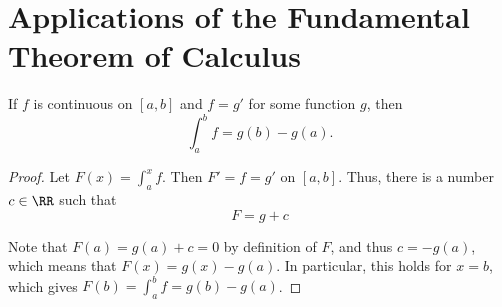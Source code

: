\documentclass[11pt]{scrartcl}
\begin{document}
\section{Applications of the Fundamental Theorem of Calculus}

\begin{corollary}
  If $f$ is continuous on $[a, b]$ and $f = g'$ for some function $g$, then
  \begin{equation*}
    \int_{a}^bf = g(b) - g(a).
  \end{equation*}
\end{corollary}

\begin{proof}
  Let $F(x) = \int_a^xf$. Then $F' = f = g'$ on $[a, b]$. Thus, there
  is a number $c\in \RR$ such that
  \begin{equation*}
    F = g + c
  \end{equation*}

  Note that $F(a) = g(a) + c = 0$ by definition of $F$, and thus
  $c = -g(a)$, which means that $F(x) = g(x) - g(a)$. In particular,
  this holds for $x=b$, which gives $F(b) = \int_a^bf = g(b) - g(a)$.
\end{proof}
\end{document}
